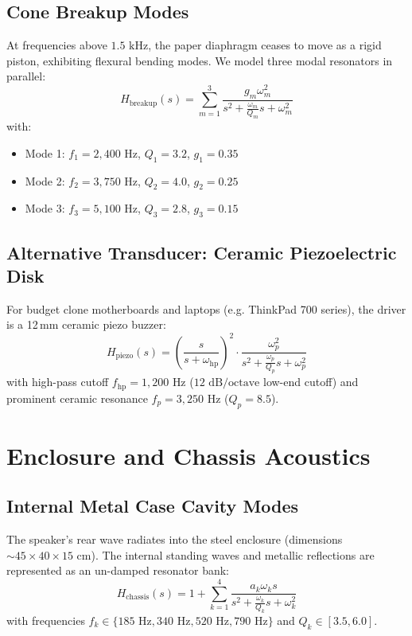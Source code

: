 \documentclass[11pt,a4paper]{article}
\begin{document}
\subsection{Cone Breakup Modes}
At frequencies above $1.5\text{ kHz}$, the paper diaphragm ceases to move as a rigid piston, exhibiting flexural bending modes. We model three modal resonators in parallel:
\begin{equation}
H_{\text{breakup}}(s) = \sum_{m=1}^{3} \frac{g_m \omega_m^2}{s^2 + \frac{\omega_m}{Q_m} s + \omega_m^2}
\end{equation}
with:
\begin{itemize}
    \item Mode 1: $f_1 = 2,400\text{ Hz}$, $Q_1 = 3.2$, $g_1 = 0.35$
    \item Mode 2: $f_2 = 3,750\text{ Hz}$, $Q_2 = 4.0$, $g_2 = 0.25$
    \item Mode 3: $f_3 = 5,100\text{ Hz}$, $Q_3 = 2.8$, $g_3 = 0.15$
\end{itemize}

\subsection{Alternative Transducer: Ceramic Piezoelectric Disk}
For budget clone motherboards and laptops (e.g. ThinkPad 700 series), the driver is a 12\,mm ceramic piezo buzzer:
\begin{equation}
H_{\text{piezo}}(s) = \left( \frac{s}{s + \omega_{\text{hp}}} \right)^2 \cdot \frac{\omega_p^2}{s^2 + \frac{\omega_p}{Q_p} s + \omega_p^2}
\end{equation}
with high-pass cutoff $f_{\text{hp}} = 1,200\text{ Hz}$ ($12\text{ dB/octave}$ low-end cutoff) and prominent ceramic resonance $f_p = 3,250\text{ Hz}$ ($Q_p = 8.5$).

\section{Enclosure and Chassis Acoustics}

\subsection{Internal Metal Case Cavity Modes}
The speaker's rear wave radiates into the steel enclosure (dimensions $\sim 45 \times 40 \times 15\text{ cm}$). The internal standing waves and metallic reflections are represented as an un-damped resonator bank:
\begin{equation}
H_{\text{chassis}}(s) = 1 + \sum_{k=1}^{4} \frac{a_k \omega_k s}{s^2 + \frac{\omega_k}{Q_k} s + \omega_k^2}
\end{equation}
with frequencies $f_k \in \{185\text{ Hz}, 340\text{ Hz}, 520\text{ Hz}, 790\text{ Hz}\}$ and $Q_k \in [3.5, 6.0]$.
\end{document}
